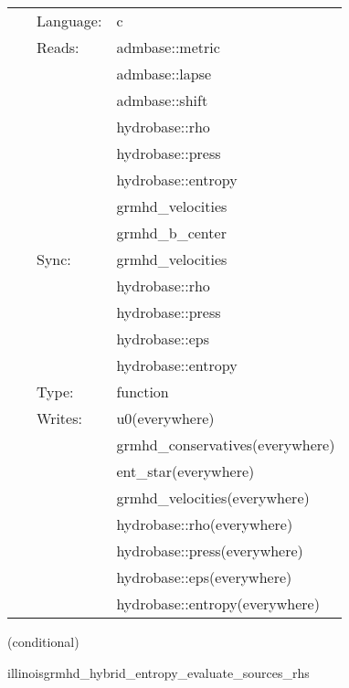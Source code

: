  \begin{tabular*}{160mm}{cll} 
~ & Language:  & c \\ 
~ & Reads:  & admbase::metric \\ 
~& ~ &admbase::lapse\\ 
~& ~ &admbase::shift\\ 
~& ~ &hydrobase::rho\\ 
~& ~ &hydrobase::press\\ 
~& ~ &hydrobase::entropy\\ 
~& ~ &grmhd\_velocities\\ 
~& ~ &grmhd\_b\_center\\ 
~ & Sync:  & grmhd\_velocities \\ 
~& ~ &hydrobase::rho\\ 
~& ~ &hydrobase::press\\ 
~& ~ &hydrobase::eps\\ 
~& ~ &hydrobase::entropy\\ 
~ & Type:  & function \\ 
~ & Writes:  & u0(everywhere) \\ 
~& ~ &grmhd\_conservatives(everywhere)\\ 
~& ~ &ent\_star(everywhere)\\ 
~& ~ &grmhd\_velocities(everywhere)\\ 
~& ~ &hydrobase::rho(everywhere)\\ 
~& ~ &hydrobase::press(everywhere)\\ 
~& ~ &hydrobase::eps(everywhere)\\ 
~& ~ &hydrobase::entropy(everywhere)\\ 
\end{tabular*} 


\vspace{5mm}

   (conditional) 

\hspace{5mm} illinoisgrmhd\_hybrid\_entropy\_evaluate\_sources\_rhs 

\hspace{5mm}{\it entropy+hybrid version of illinoisgrmhd\_evaluate\_sources\_rhs } 


\hspace{5mm}

